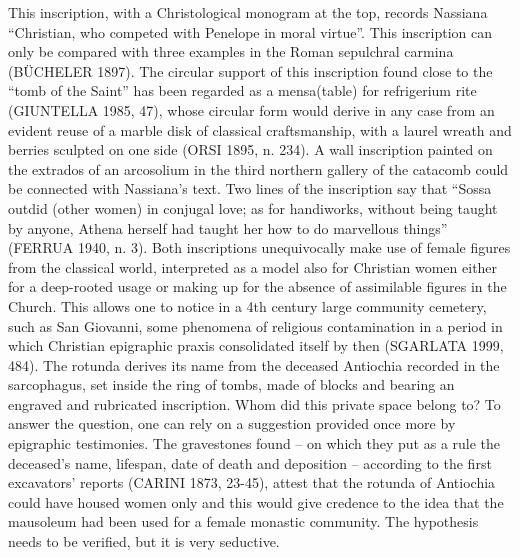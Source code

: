 \documentclass[amsthm,ebook]{saparticle}
\begin{document}
This inscription, with a Christological monogram at the top, records Nassiana “Christian, who competed with Penelope in moral virtue”. This inscription can only be compared with three examples in the Roman sepulchral carmina (BÜCHELER 1897). The circular support of this inscription found close to the “tomb of the Saint” has been regarded as a
mensa(table) for refrigerium rite (GIUNTELLA 1985, 47), whose circular form would derive in any case from an evident reuse of a marble disk of classical craftsmanship, with a laurel wreath and berries sculpted on one side (ORSI 1895, n. 234). A wall inscription painted on the extrados of an arcosolium in the third northern gallery of the catacomb could be connected with Nassiana’s text. Two lines of the inscription say that “Sossa outdid (other women) in conjugal love; as for handiworks, without being taught by anyone, Athena herself had taught her how to do marvellous things” (FERRUA 1940, n. 3). Both inscriptions unequivocally make use of female figures from the classical world, interpreted as a model also for Christian women either for a deep-rooted usage or making up for the absence of assimilable figures in the Church. This allows one to notice in a 4th century large community cemetery, such as San Giovanni, some phenomena of religious contamination in a period in which Christian epigraphic praxis consolidated itself by then (SGARLATA 1999, 484).
The rotunda derives its name from the deceased Antiochia recorded in the sarcophagus, set inside the ring of tombs, made of blocks and bearing an engraved and rubricated inscription. Whom did this private space belong to? To answer the question, one can rely on a suggestion provided once more by epigraphic testimonies. The gravestones found – on which they put as a rule the deceased’s name, lifespan, date of death and deposition – according to the first excavators’ reports (CARINI 1873, 23-45), attest that the rotunda of Antiochia could have housed women only and this would give credence to the idea that the mausoleum had been used for a female monastic community. The hypothesis needs to be verified, but it is very seductive.
\end{document}
